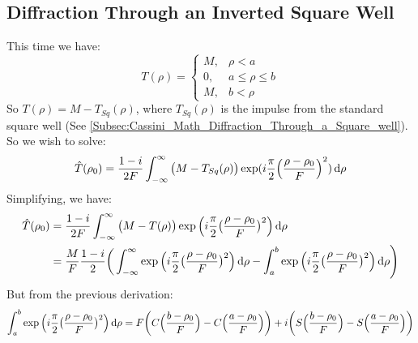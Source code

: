     \subsection{Diffraction Through an Inverted Square Well}
        This time we have:
        \begin{equation*}
            T(\rho)=
            \begin{cases}
                M,&\rho<a\\
                0,&a\leq\rho\leq{b}\\
                M,&b<\rho
            \end{cases}
        \end{equation*}
        So $T(\rho) = M - T_{Sq}(\rho)$,
        where $T_{Sq}(\rho)$ is the impulse from the standard
        square well (See
        \ref{Subsec:Cassini_Math_Diffraction_Through_a_Square_well}).
        So we wish to solve:
        \begin{equation*}
            \hat{T}(\rho_{0})=
            \frac{1-i}{2F}\int_{-\infty}^{\infty}
            \big(M-T_{Sq}(\rho)\big)
            \exp(i\frac{\pi}{2}\Big(\frac{\rho-\rho_{0}}{F}\Big)^{2})
            \mathop{}\!\mathrm{d}{\rho}
        \end{equation*}
            Simplifying, we have:
            \begin{align*}
                \hat{T}(\rho_{0})
                &=\frac{1-i}{2F}\int_{-\infty}^{\infty}
                \big(M-T(\rho)\big)
                \exp\Big(i\frac{\pi}{2}
                    \big(\frac{\rho-\rho_0}{F}\big)^{2}\Big)
                \mathop{}\!\mathrm{d}{\rho}\\
                &=\frac{M}{F}\frac{1-i}{2}
                \bigg(\int_{-\infty}^{\infty}
                \exp\Big(i\frac{\pi}{2}
                    \big(\frac{\rho-\rho_0}{F}\big)^2\Big)
                \mathop{}\!\mathrm{d}{\rho}-
                \int_{a}^{b}
                \exp\Big(i\frac{\pi}{2}
                    \big(\frac{\rho-\rho_0}{F}\big)^2\Big)
                \mathop{}\!\mathrm{d}{\rho}\Bigg)\\
            \end{align*}
            But from the previous derivation:
            \begin{equation*}
                \int_{a}^{b}
                \exp\Big(i\frac{\pi}{2}
                    \big(\frac{\rho-\rho_0}{F}\big)^{2}\Big)
                \mathop{}\!\mathrm{d}{\rho}
                =F\bigg(C\Big(\frac{b-\rho_0}{F}\Big)-
                C\Big(\frac{a-\rho_0}{F}\Big)\bigg)+
                i\bigg(S\Big(\frac{b-\rho_0}{F}\Big)-
                S\Big(\frac{a-\rho_0}{F}\Big)\bigg)
            \end{equation*}
